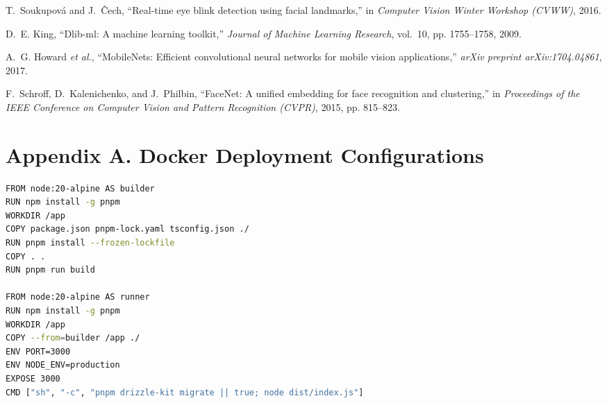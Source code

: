 \documentclass[12pt,a4paper,oneside]{article}
\begin{document}

\begin{thebibliography}{99}
T.~Soukupov{\'a} and J.~{\v{C}}ech, ``Real-time eye blink detection using facial landmarks,'' in \emph{Computer Vision Winter Workshop (CVWW)}, 2016.

D.~E. King, ``Dlib-ml: A machine learning toolkit,'' \emph{Journal of Machine Learning Research}, vol.~10, pp. 1755--1758, 2009.

A.~G. Howard \emph{et al.}, ``MobileNets: Efficient convolutional neural networks for mobile vision applications,'' \emph{arXiv preprint arXiv:1704.04861}, 2017.

F.~Schroff, D.~Kalenichenko, and J.~Philbin, ``FaceNet: A unified embedding for face recognition and clustering,'' in \emph{Proceedings of the IEEE Conference on Computer Vision and Pattern Recognition (CVPR)}, 2015, pp. 815--823.
\end{thebibliography}

\newpage
\section*{Appendix A. Docker Deployment Configurations}

\begin{lstlisting}[language=bash, caption={Production Multi-Stage Dockerfile}]
FROM node:20-alpine AS builder
RUN npm install -g pnpm
WORKDIR /app
COPY package.json pnpm-lock.yaml tsconfig.json ./
RUN pnpm install --frozen-lockfile
COPY . .
RUN pnpm run build

FROM node:20-alpine AS runner
RUN npm install -g pnpm
WORKDIR /app
COPY --from=builder /app ./
ENV PORT=3000
ENV NODE_ENV=production
EXPOSE 3000
CMD ["sh", "-c", "pnpm drizzle-kit migrate || true; node dist/index.js"]
\end{lstlisting}
\end{document}
